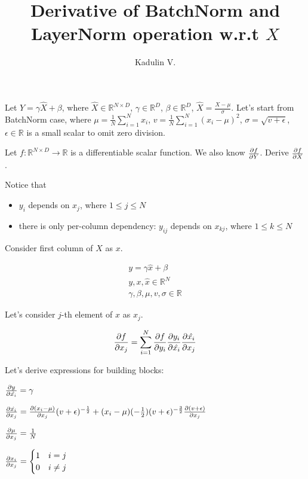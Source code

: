 \documentclass[12pt]{article}
\begin{document}
\title{Derivative of BatchNorm and LayerNorm operation w.r.t $X$}
\author{Kadulin V.}
\maketitle

Let $Y = \gamma \hat{X} + \beta$, where 
$\hat{X} \in \mathbb{R}^{N \times D}$, 
$\gamma \in \mathbb{R}^D$, 
$\beta \in \mathbb{R}^D$, 
$\hat{X} = \frac{X - \mu}{\sigma}$.
Let's start from BatchNorm case, where  
$\mu = \frac{1}{N} \sum_{i=1}^{N} x_{i}$,
$v = \frac{1}{N} \sum_{i=1}^{N} (x_i - \mu)^2$,
$\sigma = \sqrt{v + \epsilon}$,
$\epsilon \in \mathbb{R}$ is a small scalar to omit zero division. 

Let $f: \mathbb{R}^{N \times D} \rightarrow \mathbb{R}$ is a differentiable scalar function. We also know $\pdv{f}{Y}$.
Derive $\pdv{f}{X}$.

Notice that
\begin{itemize}
\item $y_i$ depends on $x_j$, where $1 \le j \le N$
\item there is only per-column dependency: $y_{ij}$ depends on $x_{kj}$, where $1 \le k \le N$
\end{itemize}

Consider first column of $X$ as $x$.

\begin{equation*}
\begin{split}
y = \gamma \hat{x} + \beta \\
y, x, \hat{x} \in \mathbb{R}^N \\
\gamma, \beta, \mu, v, \sigma \in \mathbb{R}
\end{split}
\end{equation*}

Let's consider $j$-th element of $x$ as $x_j$.

\[
	\pdv{f}{x_j} = 
	\sum_{i=1}^{N} \pdv{f}{y_i} \pdv{y_i}{\hat{x_i}} \pdv{\hat{x_i}}{x_j}
\]

\newpage

Let's derive expressions for building blocks:

$\pdv{y}{\hat{x_i}} = \gamma$ 

$\pdv{\hat{x_i}}{x_j} = 
\pdv{(x_i - \mu)}{x_j} (v + \epsilon)^{-\frac{1}{2}} + (x_i - \mu) (-\frac{1}{2}) (v + \epsilon)^{-\frac{3}{2}} \pdv{(v + \epsilon)}{x_j}$

$\pdv{\mu}{x_j} = \frac{1}{N}$

$
\pdv{x_i}{x_j} = 
\begin{cases}
1 &\text{$i = j$}\\
0 &\text{$i \ne j$}
\end{cases}
$
\end{document}
